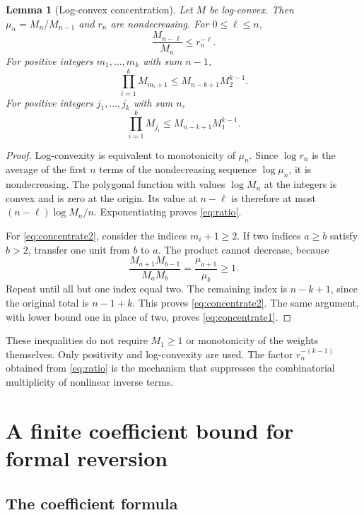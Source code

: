 \documentclass[11pt,a4paper]{article}
\numberwithin{equation}{section}
\newtheorem{lemma}[theorem]{Lemma}
\theoremstyle{definition}
\theoremstyle{remark}
\begin{document}
\begin{lemma}[Log-convex concentration]
\label{lem:concentration}
Let $M$ be log-convex. Then $\mu_n=M_n/M_{n-1}$ and $r_n$ are
nondecreasing. For $0\le\ell\le n$,
\begin{equation}
 \frac{M_{n-\ell}}{M_n}\le r_n^{-\ell}.
 \label{eq:ratio}
\end{equation}
For positive integers $m_1,\ldots,m_k$ with sum $n-1$,
\begin{equation}
 \prod_{i=1}^k M_{m_i+1}
       \le M_{n-k+1}M_2^{k-1}.
 \label{eq:concentrate2}
\end{equation}
For positive integers $j_1,\ldots,j_k$ with sum $n$,
\begin{equation}
 \prod_{i=1}^k M_{j_i}
       \le M_{n-k+1}M_1^{k-1}.
 \label{eq:concentrate1}
\end{equation}
\end{lemma}
\begin{proof}
Log-convexity is equivalent to monotonicity of $\mu_n$. Since
$\log r_n$ is the average of the first $n$ terms of the nondecreasing
sequence $\log\mu_n$, it is nondecreasing. The polygonal function with
values $\log M_n$ at the integers is convex and is zero at the origin.
Its value at $n-\ell$ is therefore at most
$(n-\ell)\log M_n/n$. Exponentiating proves \eqref{eq:ratio}.

For \eqref{eq:concentrate2}, consider the indices $m_i+1\ge2$.
If two indices $a\ge b$ satisfy $b>2$, transfer one unit from $b$ to
$a$. The product cannot decrease, because
\[
 \frac{M_{a+1}M_{b-1}}{M_aM_b}
      =\frac{\mu_{a+1}}{\mu_b}\ge1.
\]
Repeat until all but one index equal two. The remaining index is
$n-k+1$, since the original total is $n-1+k$. This proves
\eqref{eq:concentrate2}. The same argument, with lower bound one in
place of two, proves \eqref{eq:concentrate1}.
\end{proof}

These inequalities do not require $M_1\ge1$ or monotonicity of the
weights themselves. Only positivity and log-convexity are used. The
factor $r_n^{-(k-1)}$ obtained from \eqref{eq:ratio} is the mechanism that
suppresses the combinatorial multiplicity of nonlinear inverse terms.

\section{A finite coefficient bound for formal reversion}
\label{sec:majorant}

\subsection{The coefficient formula}
\end{document}
